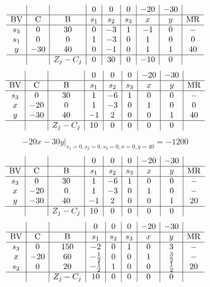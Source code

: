\documentclass{article}
\begin{document}
\begin{align*}
\begin{array}{c|c|c|c|c|c|c|c|c}
 &  &  & 0 & 0 & 0 & -20 & -30 & \\
\hline
\text{BV} & \text{C} & \text{B} & s_{1} & s_{2} & s_{3} & x & y & \text{MR} \\
\hline
s_{3} & 0 & 30 & 0 & -3 & 1 & -1 & 0 & - \\
s_{1} & 0 & 0 & 1 & -3 & 0 & 1 & 0 & 0 \\
y & -30 & 40 & 0 & -1 & 0 & 1 & 1 & 40 \\
\hline
 &  & Z_j-C_j & 0 & 30 & 0 & -10 & 0 & \\
\end{array}
\end{align*}
\begin{align*}
\begin{array}{c|c|c|c|c|c|c|c|c}
 &  &  & 0 & 0 & 0 & -20 & -30 & \\
\hline
\text{BV} & \text{C} & \text{B} & s_{1} & s_{2} & s_{3} & x & y & \text{MR} \\
\hline
s_{3} & 0 & 30 & 1 & -6 & 1 & 0 & 0 & - \\
x & -20 & 0 & 1 & -3 & 0 & 1 & 0 & 0 \\
y & -30 & 40 & -1 & 2 & 0 & 0 & 1 & 40 \\
\hline
 &  & Z_j-C_j & 10 & 0 & 0 & 0 & 0 & \\
\end{array}
\end{align*}
\begin{align*}
\left.-20x - 30y\right|_{s_{1}=0,s_{2}=0,s_{3}=0,x=0,y=40}=-1200\end{align*}
\begin{align*}
\begin{array}{c|c|c|c|c|c|c|c|c}
 &  &  & 0 & 0 & 0 & -20 & -30 & \\
\hline
\text{BV} & \text{C} & \text{B} & s_{1} & s_{2} & s_{3} & x & y & \text{MR} \\
\hline
s_{3} & 0 & 30 & 1 & -6 & 1 & 0 & 0 & - \\
x & -20 & 0 & 1 & -3 & 0 & 1 & 0 & - \\
y & -30 & 40 & -1 & 2 & 0 & 0 & 1 & 20 \\
\hline
 &  & Z_j-C_j & 10 & 0 & 0 & 0 & 0 & \\
\end{array}
\end{align*}
\begin{align*}
\begin{array}{c|c|c|c|c|c|c|c|c}
 &  &  & 0 & 0 & 0 & -20 & -30 & \\
\hline
\text{BV} & \text{C} & \text{B} & s_{1} & s_{2} & s_{3} & x & y & \text{MR} \\
\hline
s_{3} & 0 & 150 & -2 & 0 & 1 & 0 & 3 & - \\
x & -20 & 60 & -\frac{1}{2} & 0 & 0 & 1 & \frac{3}{2} & - \\
s_{2} & 0 & 20 & -\frac{1}{2} & 1 & 0 & 0 & \frac{1}{2} & 20 \\
\hline
 &  & Z_j-C_j & 10 & 0 & 0 & 0 & 0 & \\
\end{array}
\end{align*}
\end{document}
